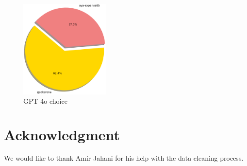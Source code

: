 \documentclass[conference]{IEEEtran}
\begin{document}
\begin{figure}[htbp]
	\centerline{\includegraphics[width=0.4\textwidth]{fig2.png}}
	\caption{GPT-4o choice}
	\label{fig2}
\end{figure}
\section*{Acknowledgment}
We would like to thank Amir Jahani for his help with the data cleaning process.
\end{document}
